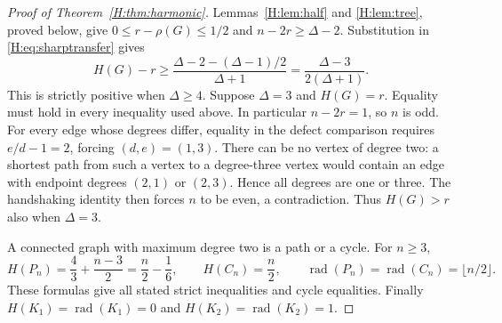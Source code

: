 \documentclass[11pt,a4paper]{article}
\theoremstyle{remark}\newtheorem{remark}[theorem]{Remark}
\newcommand{\rad}{\operatorname{rad}}\newcommand{\diam}{\operatorname{diam}}\newcommand{\dist}{\operatorname{dist}}
\numberwithin{equation}{section}
\begin{document}
\begin{proof}[Proof of Theorem~\ref{H:thm:harmonic}]
Lemmas~\ref{H:lem:half} and \ref{H:lem:tree}, proved below, give
$0\le r-\rho(G)\le1/2$ and $n-2r\ge\Delta-2$.
Substitution in \eqref{H:eq:sharptransfer} gives
\[
 H(G)-r\ge\frac{\Delta-2-(\Delta-1)/2}{\Delta+1}
 =\frac{\Delta-3}{2(\Delta+1)}.
\]
This is strictly positive when $\Delta\ge4$.
Suppose $\Delta=3$ and $H(G)=r$. Equality must hold in every
inequality used above. In particular $n-2r=1$, so $n$ is odd.
For every edge whose degrees differ, equality in the defect comparison
requires $e/d-1=2$, forcing $(d,e)=(1,3)$. There can be no vertex of
degree two: a shortest path from such a vertex to a degree-three vertex
would contain an edge with endpoint degrees $(2,1)$ or $(2,3)$.
Hence all degrees are one or three. The handshaking identity then forces
$n$ to be even, a contradiction. Thus $H(G)>r$ also when $\Delta=3$.

A connected graph with maximum degree two is a path or a cycle.
For $n\ge3$,
\[
 H(P_n)=\frac43+\frac{n-3}{2}=\frac n2-\frac16,
 \qquad H(C_n)=\frac n2,
 \qquad \rad(P_n)=\rad(C_n)=\lfloor n/2\rfloor.
\]
These formulas give all stated strict inequalities and cycle equalities.
Finally $H(K_1)=\rad(K_1)=0$ and $H(K_2)=\rad(K_2)=1$.
\end{proof}
\end{document}
